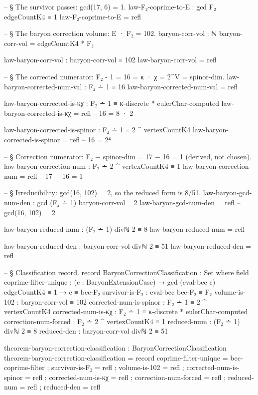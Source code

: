 \documentclass[11pt,a4paper]{book}
\begin{document}
\begin{code}
-- § The survivor passes: gcd(17, 6) = 1.
law-F₂-coprime-to-E : gcd F₂ edgeCountK4 ≡ 1
law-F₂-coprime-to-E = refl

-- § The baryon correction volume: E · F₂ = 102.
baryon-corr-vol : ℕ
baryon-corr-vol = edgeCountK4 * F₂

law-baryon-corr-vol : baryon-corr-vol ≡ 102
law-baryon-corr-vol = refl

-- § The corrected numerator: F₂ - 1 = 16 = κ · χ = 2^V = spinor-dim.
law-baryon-corrected-num-val : F₂ ∸ 1 ≡ 16
law-baryon-corrected-num-val = refl

law-baryon-corrected-is-κχ : F₂ ∸ 1 ≡ κ-discrete * eulerChar-computed
law-baryon-corrected-is-κχ = refl  -- 16 = 8 · 2

law-baryon-corrected-is-spinor : F₂ ∸ 1 ≡ 2 ^ vertexCountK4
law-baryon-corrected-is-spinor = refl  -- 16 = 2⁴

-- § Correction numerator: F₂ − spinor-dim = 17 − 16 = 1 (derived, not chosen).
law-baryon-correction-num : F₂ ∸ 2 ^ vertexCountK4 ≡ 1
law-baryon-correction-num = refl  -- 17 − 16 = 1

-- § Irreducibility: gcd(16, 102) = 2, so the reduced form is 8/51.
law-baryon-gcd-num-den : gcd (F₂ ∸ 1) baryon-corr-vol ≡ 2
law-baryon-gcd-num-den = refl  -- gcd(16, 102) = 2

law-baryon-reduced-num : (F₂ ∸ 1) divℕ 2 ≡ 8
law-baryon-reduced-num = refl

law-baryon-reduced-den : baryon-corr-vol divℕ 2 ≡ 51
law-baryon-reduced-den = refl

-- § Classification record.
record BaryonCorrectionClassification : Set where
  field
    coprime-filter-unique : (c : BaryonExtensionCase) →
      gcd (eval-bec c) edgeCountK4 ≡ 1 → c ≡ bec-F₂
    survivor-is-F₂        : eval-bec bec-F₂ ≡ F₂
    volume-is-102          : baryon-corr-vol ≡ 102
    corrected-num-is-spinor : F₂ ∸ 1 ≡ 2 ^ vertexCountK4
    corrected-num-is-κχ   : F₂ ∸ 1 ≡ κ-discrete * eulerChar-computed
    correction-num-forced  : F₂ ∸ 2 ^ vertexCountK4 ≡ 1
    reduced-num            : (F₂ ∸ 1) divℕ 2 ≡ 8
    reduced-den            : baryon-corr-vol divℕ 2 ≡ 51

theorem-baryon-correction-classification : BaryonCorrectionClassification
theorem-baryon-correction-classification = record
  { coprime-filter-unique = bec-coprime-filter
  ; survivor-is-F₂        = refl
  ; volume-is-102          = refl
  ; corrected-num-is-spinor = refl
  ; corrected-num-is-κχ   = refl
  ; correction-num-forced  = refl
  ; reduced-num            = refl
  ; reduced-den            = refl
  }


\end{code}
\end{document}
